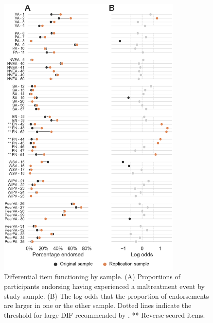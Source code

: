 \documentclass[letterpaper,man,natbib,noextraspace,floatsintext,longtable,12pt]{apa6}
\begin{document}
\begin{figure}[H]
    \centering
    \includegraphics[width=0.82\textwidth,center]{figures/figS01.png}
    \caption{\normalfont Differential item functioning by sample. (A) Proportions of participants endorsing having experienced a maltreatment event by study sample. (B) The log odds that the proportion of endorsements are larger in one or the other sample. Dotted lines indicate the threshold for large DIF recommended by \cite{hidalgo2014binary}. ** Reverse-scored items.}
    \label{fig:dif_study}
\end{figure}
\end{document}
